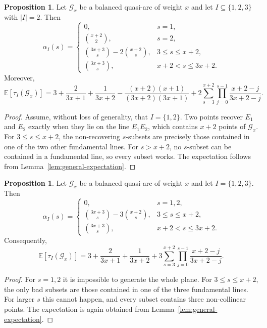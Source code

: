 \documentclass[11pt,a4paper]{article}
\numberwithin{equation}{section}
\theoremstyle{definition}
\theoremstyle{definition}
\newtheorem{proposition}[definition]{Proposition}
\newcommand{\E}{\mathbb{E}}
\newcommand{\cG}{\mathcal{G}}
\begin{document}
\begin{proposition}\label{prop:quasi-m2}
Let $\cG_x$ be a balanced quasi-arc of weight $x$ and let $I\subseteq\{1,2,3\}$ with $|I|=2$.  Then
\[
\alpha_I(s)=
\begin{cases}
0, & s=1,\\[1mm]
\binom{x+2}{2}, & s=2,\\[1mm]
\binom{3x+3}{s}-2\binom{x+2}{s}, & 3\le s\le x+2,\\[1mm]
\binom{3x+3}{s}, & x+2<s\le 3x+2.
\end{cases}
\]
Moreover,
\begin{equation}\label{eq:quasi-m2}
\E[\tau_I(\cG_x)]
=3+\frac{2}{3x+1}+\frac{1}{3x+2}
-\frac{(x+2)(x+1)}{(3x+2)(3x+1)}
+2\sum_{s=3}^{x+2}\prod_{j=0}^{s-1}\frac{x+2-j}{3x+2-j}.
\end{equation}
\end{proposition}

\begin{proof}
Assume, without loss of generality, that $I=\{1,2\}$.  Two points recover $E_1$ and $E_2$ exactly when they lie on the line $E_1E_2$, which contains $x+2$ points of $\cG_x$.  For $3\le s\le x+2$, the non-recovering $s$-subsets are precisely those contained in one of the two other fundamental lines.  For $s>x+2$, no $s$-subset can be contained in a fundamental line, so every subset works.  The expectation follows from Lemma~\ref{lem:general-expectation}.
\end{proof}

\begin{proposition}\label{prop:quasi-m3}
Let $\cG_x$ be a balanced quasi-arc of weight $x$ and let $I=\{1,2,3\}$.  Then
\[
\alpha_I(s)=
\begin{cases}
0, & s=1,2,\\[1mm]
\binom{3x+3}{s}-3\binom{x+2}{s}, & 3\le s\le x+2,\\[1mm]
\binom{3x+3}{s}, & x+2<s\le 3x+2.
\end{cases}
\]
Consequently,
\begin{equation}\label{eq:quasi-m3}
\E[\tau_I(\cG_x)]
=3+\frac{2}{3x+1}+\frac{1}{3x+2}
+3\sum_{s=3}^{x+2}\prod_{j=0}^{s-1}\frac{x+2-j}{3x+2-j}.
\end{equation}
\end{proposition}

\begin{proof}
For $s=1,2$ it is impossible to generate the whole plane.  For $3\le s\le x+2$, the only bad subsets are those contained in one of the three fundamental lines.  For larger $s$ this cannot happen, and every subset contains three non-collinear points.  The expectation is again obtained from Lemma~\ref{lem:general-expectation}.
\end{proof}
\end{document}
